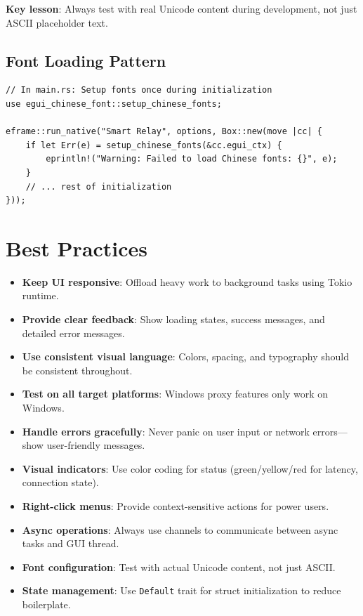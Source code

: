 \textbf{Key lesson}: Always test with real Unicode content during development, not just ASCII placeholder text.

\subsection{Font Loading Pattern}

\begin{verbatim}
// In main.rs: Setup fonts once during initialization
use egui_chinese_font::setup_chinese_fonts;

eframe::run_native("Smart Relay", options, Box::new(move |cc| {
    if let Err(e) = setup_chinese_fonts(&cc.egui_ctx) {
        eprintln!("Warning: Failed to load Chinese fonts: {}", e);
    }
    // ... rest of initialization
}));
\end{verbatim}

\section{Best Practices}

\begin{itemize}
    \item \textbf{Keep UI responsive}: Offload heavy work to background tasks using Tokio runtime.
    \item \textbf{Provide clear feedback}: Show loading states, success messages, and detailed error messages.
    \item \textbf{Use consistent visual language}: Colors, spacing, and typography should be consistent throughout.
    \item \textbf{Test on all target platforms}: Windows proxy features only work on Windows.
    \item \textbf{Handle errors gracefully}: Never panic on user input or network errors—show user-friendly messages.
    \item \textbf{Visual indicators}: Use color coding for status (green/yellow/red for latency, connection state).
    \item \textbf{Right-click menus}: Provide context-sensitive actions for power users.
    \item \textbf{Async operations}: Always use channels to communicate between async tasks and GUI thread.
    \item \textbf{Font configuration}: Test with actual Unicode content, not just ASCII.
    \item \textbf{State management}: Use \texttt{Default} trait for struct initialization to reduce boilerplate.
\end{itemize}


